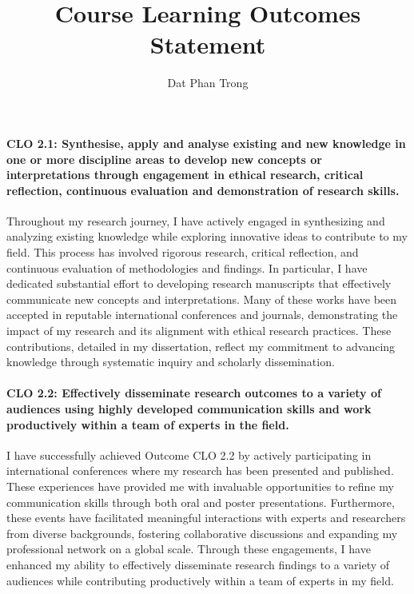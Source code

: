 \documentclass[12pt, %
oneside]{article}
\title{Course Learning Outcomes Statement}
\author{Dat Phan Trong}
\date{}
\begin{document}
\maketitle

\paragraph{CLO 2.1: Synthesise, apply and analyse existing and new knowledge in one or more discipline areas to develop new concepts or interpretations through engagement in ethical research, critical reflection, continuous evaluation and demonstration of research skills. \\}
\noindent Throughout my research journey, I have actively engaged in synthesizing and analyzing existing knowledge while exploring innovative ideas to contribute to my field. This process has involved rigorous research, critical reflection, and continuous evaluation of methodologies and findings. In particular, I have dedicated substantial effort to developing research manuscripts that effectively communicate new concepts and interpretations. Many of these works have been accepted in reputable international conferences and journals, demonstrating the impact of my research and its alignment with ethical research practices. These contributions, detailed in my dissertation, reflect my commitment to advancing knowledge through systematic inquiry and scholarly dissemination.
\paragraph{CLO 2.2: Effectively disseminate research outcomes to a variety of audiences using highly developed communication skills and work productively within a team of experts in the field. \\} 
\noindent I have successfully achieved Outcome CLO 2.2 by actively participating in international conferences where my research has been presented and published. These experiences have provided me with invaluable opportunities to refine my communication skills through both oral and poster presentations. Furthermore, these events have facilitated meaningful interactions with experts and researchers from diverse backgrounds, fostering collaborative discussions and expanding my professional network on a global scale. Through these engagements, I have enhanced my ability to effectively disseminate research findings to a variety of audiences while contributing productively within a team of experts in my field.
\end{document}
